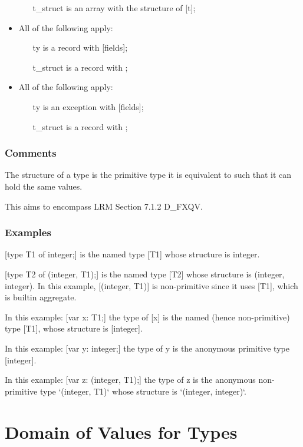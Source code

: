 \documentclass{book}
\begin{document}
\begin{itemize}
\begin{itemize}
      \item  [t\_struct] is an array with the structure of [t];
      \end{itemize}
    \item  All of the following apply:
      \begin{itemize}
      \item  [ty] is a record with [fields];
      \item  [t\_struct] is a record with ;
      \end{itemize}
    \item  All of the following apply:
      \begin{itemize}
      \item  [ty] is an exception with [fields];
      \item  [t\_struct] is a record with ;
      \end{itemize}
    \end{itemize}
      
    \subsubsection{Comments}
    The structure of a type is the primitive type it is equivalent to such that
    it can hold the same values. 

    This aims to encompass LRM Section 7.1.2 D\_FXQV.

    \subsubsection{Examples}
    [type T1 of integer;]
    is the named type [T1] whose structure is integer.

    [type T2 of (integer, T1);]
    is the named type [T2] whose structure is (integer, integer). In this
    example, [(integer, T1)] is non-primitive since it uses [T1], which is builtin aggregate.

    In this example:
    [var x: T1;]
    the type of [x] is the named (hence non-primitive) type [T1], whose structure
    is [integer].

    In this example:
    [var y: integer;]
    the type of y is the anonymous primitive type [integer].

    In this example:
    [var z: (integer, T1);]
    the type of z is the anonymous non-primitive type `(integer, T1)` whose
    structure is `(integer, integer)`.

\section{Domain of Values for Types}
\end{document}
